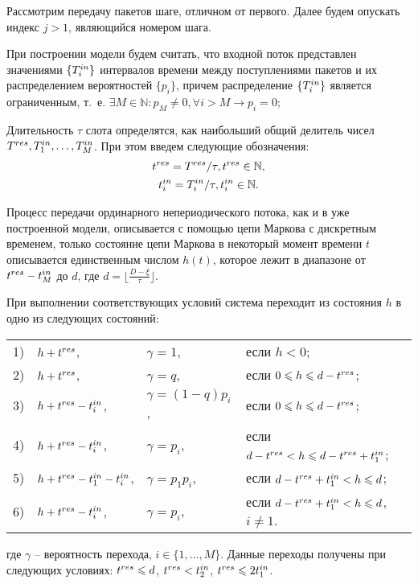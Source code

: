 Рассмотрим передачу пакетов шаге, отличном от первого. Далее будем опускать индекс $j > 1$, являющийся номером шага. 

При построении модели будем считать, что входной поток представлен значениями $\{T^{in}_i\}$ интервалов времени между поступлениями пакетов и их распределением вероятностей $\{p_i\}$, причем распределение $\{T^{in}_i\}$ является ограниченным, т.~е. $\exists M \in \mathbb{N} \colon p_M \ne 0, \forall i > M \longrightarrow p_i = 0$;

Длительность $\tau$ слота определятся, как наибольший общий делитель чисел $T^{res}, T^{in}_1, \dots, T^{in}_M$. При этом введем следующие обозначения:
\begin{gather}
	t^{res} = T^{res}/\tau, t^{res}\in\mathbb{N}, \notag \\
	t^{in}_i = T^{in}_i/\tau, t^{in}_i \in \mathbb{N}. \notag
\end{gather}

Процесс передачи ординарного непериодического потока, как и в уже построенной модели, описывается с помощью цепи Маркова с дискретным временем, только состояние цепи Маркова в некоторый момент времени $t$ описывается единственным числом $h(t)$, которое лежит в диапазоне от $t^{res} - t^{in}_M$ до $d$, где $d = \lfloor \frac{D-\xi}{\tau} \rfloor$.

При выполнении соответствующих условий система переходит из состояния $h$ в одно из следующих состояний:

\begin{tabular}{l l l l}
1) &$h + t^{res}$, &$\gamma = 1$, &если $h < 0$; \\
2) &$h + t^{res}$, &$\gamma = q$, &если $0 \leqslant h \leqslant d - t^{res}$; \\
3) &$h+t^{res}-t^{in}_i$, &$\gamma = (1-q) p_i$, &если $0 \leqslant h \leqslant d - t^{res}$; \\
4) &$h+t^{res}-t^{in}_i$, &$\gamma = p_i$, &если $d - t^{res} < h \leqslant d - t^{res} + t^{in}_1$; \\
5) &$h+t^{res}-t^{in}_1 - t^{in}_i$, &$\gamma = p_1 p_i$, &если $d - t^{res} + t^{in}_1 < h \leqslant d$; \\
6) &$h+t^{res}-t^{in}_i$, &$\gamma = p_i$, &если $d - t^{res} + t^{in}_1 < h \leqslant d$, $i\ne 1$. 
\end{tabular} \newline
где $\gamma$ -- вероятность перехода, $i\in\{1,\dots,M\}$. 
Данные переходы получены при следующих условиях: $t^{res} \leqslant d$, $t^{res} < t^{in}_2$, \mbox{$t^{res} \leqslant 2t^{in}_1$}.

